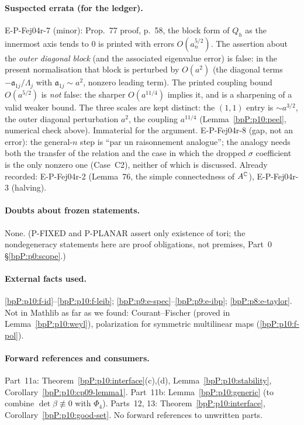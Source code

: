 \paragraph{Suspected errata (for the ledger).} E-P-Fej04r-7 (minor): Prop.~77 proof, p.~58, the block form of $Q_h$ as the innermost axis tends to $0$ is printed with errors $O(a_n^{5/2})$. The assertion about the \emph{outer diagonal block} (and the associated eigenvalue error) is false: in the present normalisation that block is perturbed by $O(a^2)$ (the diagonal terms $-\mathfrak a_{1j}/\Lambda_j$ with $\mathfrak a_{1j}\sim a^2$, nonzero leading term). The printed coupling bound $O(a^{5/2})$ is \emph{not} false: the sharper $O(a^{11/4})$ implies it, and is a sharpening of a valid weaker bound. The three scales are kept distinct: the $(1,1)$ entry is $\sim a^{3/2}$, the outer diagonal perturbation $a^2$, the coupling $a^{11/4}$ (Lemma~\ref{bpP:p10:peel}, numerical check above). Immaterial for the argument. E-P-Fej04r-8 (gap, not an error): the general-$n$ step is ``par un raisonnement analogue''; the analogy needs both the transfer of the relation and the case in which the dropped $\sigma$ coefficient is the only nonzero one (Case~C2), neither of which is discussed. Already recorded: E-P-Fej04r-2 (Lemma~76, the simple connectedness of $A^{\mathbb{C}}$), E-P-Fej04r-3 (halving).

\paragraph{Doubts about frozen statements.} None. (P-FIXED and P-PLANAR assert only existence of tori; the nondegeneracy statements here are proof obligations, not premises, Part~0 \S\ref{bpP:p0:scope}.)

\paragraph{External facts used.} \ref{bpP:p10:f-id}--\ref{bpP:p10:f-leib}; \ref{bpP:p9:e-spec}--\ref{bpP:p9:e-ibp}; \ref{bpP:p8:e-taylor}. Not in Mathlib as far as we found: Courant--Fischer (proved in Lemma~\ref{bpP:p10:weyl}), polarization for symmetric multilinear maps (\ref{bpP:p10:f-pol}).

\paragraph{Forward references and consumers.} Part~11a: Theorem~\ref{bpP:p10:interface}(c),(d), Lemma~\ref{bpP:p10:stability}, Corollary~\ref{bpP:p10:cp09-lemma1}. Part~11b: Lemma~\ref{bpP:p10:generic} (to combine $\det\beta\not\equiv0$ with $\Phi_4$). Parts~12, 13: Theorem~\ref{bpP:p10:interface}, Corollary~\ref{bpP:p10:good-set}. No forward references to unwritten parts.

